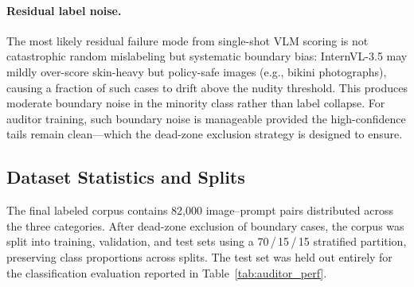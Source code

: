 \paragraph{Residual label noise.}
The most likely residual failure mode from single-shot VLM scoring is not
catastrophic random mislabeling but systematic boundary bias: InternVL-3.5
may mildly over-score skin-heavy but policy-safe images (e.g., bikini
photographs), causing a fraction of such cases to drift above the nudity
threshold. This produces moderate boundary noise in the minority class rather
than label collapse. For auditor training, such boundary noise is manageable
provided the high-confidence tails remain clean---which the dead-zone
exclusion strategy is designed to ensure.

\subsection{Dataset Statistics and Splits}
\label{app:dataset_stats}

The final labeled corpus contains 82,000 image--prompt pairs distributed
across the three categories. After dead-zone exclusion of boundary cases, the
corpus was split into training, validation, and test sets using a
70\,/\,15\,/\,15 stratified partition, preserving class proportions across
splits. The test set was held out entirely for the classification evaluation
reported in Table~\ref{tab:auditor_perf}.